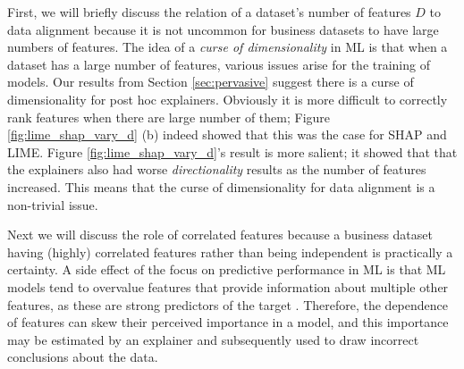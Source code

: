 \documentclass[mnsc,blindrev]{informs3}
\begin{document}
         First, we will briefly discuss the relation of a dataset's number of features $D$ to data alignment because it is not uncommon for business datasets to have large numbers of features. The idea of a \emph{curse of dimensionality} in ML is that when a dataset has a large number of features, various issues arise for the training of models. Our results from Section \ref{sec:pervasive} suggest there is a curse of dimensionality for post hoc explainers. Obviously it is more difficult to correctly rank features when there are large number of them; Figure \ref{fig:lime_shap_vary_d} (b) indeed showed that this was the case for SHAP and LIME. Figure \ref{fig:lime_shap_vary_d}'s result is more salient; it showed that that the explainers also had worse \emph{directionality} results as the number of features increased. This means that the curse of dimensionality for data alignment is a non-trivial issue.
        
         Next we will discuss the role of correlated features because a business dataset having (highly) correlated features rather than being independent is practically a certainty. %
         A side effect of the focus on predictive performance in ML is that ML models tend to overvalue features that provide information about multiple other features, as these are strong predictors of the target \citep{scholkopf2021toward}. Therefore, the dependence of features can skew their perceived importance in a model, and this importance may be estimated by an explainer and subsequently used to draw incorrect conclusions about the data.



          

\end{document}
